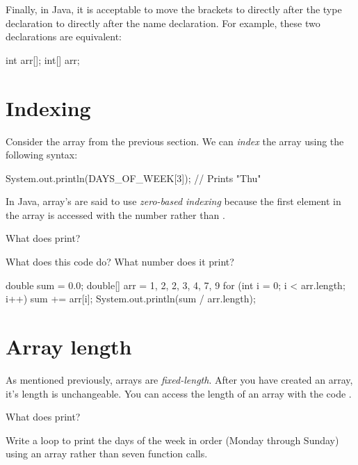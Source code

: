 Finally, in Java, it is acceptable to move the brackets to directly after the type declaration to directly after the name declaration. For example, these two declarations are equivalent:

\begin{code}
int arr[];
int[] arr;
\end{code}

\section{Indexing}

Consider the array  from the previous section. We can \emph{index} the array using the following syntax:

\begin{code}
System.out.println(DAYS_OF_WEEK[3]);  // Prints "Thu"
\end{code}

In Java, array's are said to use \emph{zero-based indexing} because the first element in the array is accessed with the number  rather than .

\begin{example}
What does  print?
\end{example}

\begin{example}
What does this code do? What number does it print?

\begin{code}
double sum = 0.0;
double[] arr = { 1, 2, 2, 3, 4, 7, 9 }
for (int i = 0; i < arr.length; i++) {
    sum += arr[i];
}
System.out.println(sum / arr.length);
\end{code}
\end{example}

\section{Array length}

As mentioned previously, arrays are \emph{fixed-length}. After you have created an array, it's length is unchangeable. You can access the length of an array  with the code .

\begin{example}
What does  print?
\end{example}

\begin{example}
Write a  loop to print the days of the week in order (Monday through Sunday) using an array rather than seven  function calls.
\end{example}

